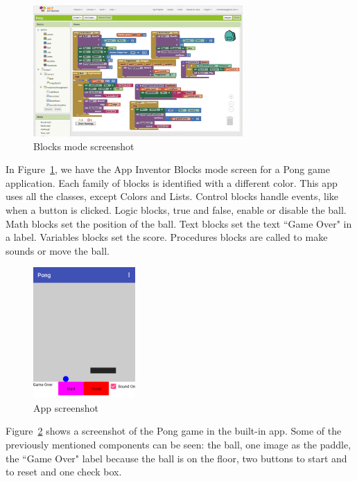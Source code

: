 \documentclass[a4paper]{article}
\begin{document}
\begin{figure}
\begin{center}
\includegraphics[height=5cm]{blocks-example}
\caption{Blocks mode screenshot}
\label{fig:blocks-example}
\end{center}
\end{figure}

In Figure~\ref{fig:blocks-example}, we have the App Inventor Blocks mode screen for a Pong game application. Each family of blocks is identified with a different color. This app uses all the classes, except Colors and Lists. Control blocks handle events, like when a button is clicked. Logic blocks, true and false, enable or disable the ball. Math blocks set the position of the ball. Text blocks set the text ``Game Over" in a label. Variables blocks set the score. Procedures blocks are called to make sounds or move the ball.

\begin{figure}
\begin{center}
\includegraphics[height=5cm]{app-screen}
\caption{App screenshot}
\label{fig:app-example}
\end{center}
\end{figure}

Figure~\ref{fig:app-example} shows a screenshot of the Pong game in the built-in app. Some of the previously mentioned components can be seen: the ball, one image as the paddle, the ``Game Over" label because the ball is on the floor, two buttons to start and to reset and one check box.
\end{document}
